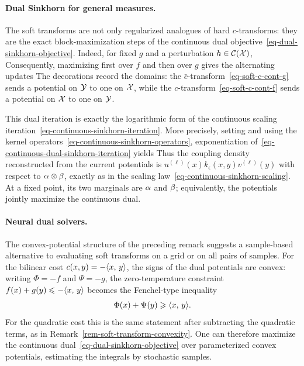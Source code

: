 \paragraph{Dual Sinkhorn for general measures.}\label{par-continuous-dual-sinkhorn}

The soft transforms are not only regularized analogues of hard $c$-transforms: they are the exact block-maximization steps of the continuous dual objective~\eqref{eq-dual-sinkhorn-objective}. Indeed, for fixed $g$ and a perturbation $h\in\mathcal{C}(\mathcal{X})$,
Consequently, maximizing first over $f$ and then over $g$ gives the alternating updates
The decorations record the domains: the $\bar c$-transform~\eqref{eq-soft-c-cont-g} sends a potential on $\mathcal{Y}$ to one on $\mathcal{X}$, while the $c$-transform~\eqref{eq-soft-c-cont-f} sends a potential on $\mathcal{X}$ to one on $\mathcal{Y}$.

This dual iteration is exactly the logarithmic form of the continuous scaling iteration~\eqref{eq-continuous-sinkhorn-iteration}. More precisely, setting
and using the kernel operators~\eqref{eq-continuous-sinkhorn-operators}, exponentiation of~\eqref{eq-continuous-dual-sinkhorn-iteration} yields
Thus the coupling density reconstructed from the current potentials is
\(
	u^{(\ell)}(x)k_\epsilon(x,y)v^{(\ell)}(y)
\)
with respect to $\alpha\otimes\beta$, exactly as in the scaling law~\eqref{eq-continuous-sinkhorn-scaling}. At a fixed point, its two marginals are $\alpha$ and $\beta$; equivalently, the potentials jointly maximize the continuous dual.

\paragraph{Neural dual solvers.}
The convex-potential structure of the preceding remark suggests a sample-based alternative to evaluating soft transforms on a grid or on all pairs of samples. For the bilinear cost \(c(x,y)=-\langle x,\,y\rangle\), the signs of the dual potentials are convex: writing \(\Phi=-f\) and \(\Psi=-g\), the zero-temperature constraint \(f(x)+g(y)\leqslant-\langle x,\,y\rangle\) becomes the Fenchel-type inequality
\[
	\Phi(x)+\Psi(y)\geqslant \langle x,\,y\rangle.
\]
For the quadratic cost this is the same statement after subtracting the quadratic terms, as in Remark~\ref{rem-soft-transform-convexity}. One can therefore maximize the continuous dual~\eqref{eq-dual-sinkhorn-objective} over parameterized convex potentials, estimating the integrals by stochastic samples.

